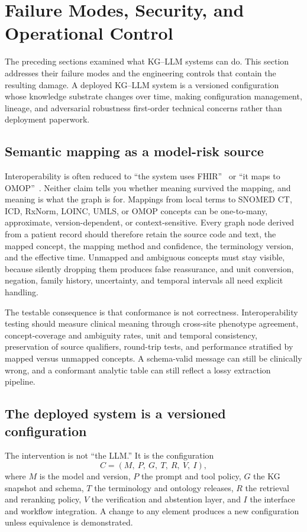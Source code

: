 \section{Failure Modes, Security, and Operational Control}
\label{sec:failure}

The preceding sections examined what KG--LLM systems can do. This section addresses their failure modes and the engineering controls that contain the resulting damage. A deployed KG--LLM system is a versioned configuration whose knowledge substrate changes over time, making configuration management, lineage, and adversarial robustness first-order technical concerns rather than deployment paperwork.

\subsection{Semantic mapping as a model-risk source}

Interoperability is often reduced to ``the system uses FHIR''~\cite{hl7fhir} or ``it maps to OMOP''~\cite{omop}. Neither claim tells you whether meaning survived the mapping, and meaning is what the graph is for. Mappings from local terms to SNOMED CT, ICD, RxNorm, LOINC, UMLS, or OMOP concepts can be one-to-many, approximate, version-dependent, or context-sensitive. Every graph node derived from a patient record should therefore retain the source code and text, the mapped concept, the mapping method and confidence, the terminology version, and the effective time. Unmapped and ambiguous concepts must stay visible, because silently dropping them produces false reassurance, and unit conversion, negation, family history, uncertainty, and temporal intervals all need explicit handling.

The testable consequence is that conformance is not correctness. Interoperability testing should measure clinical meaning through cross-site phenotype agreement, concept-coverage and ambiguity rates, unit and temporal consistency, preservation of source qualifiers, round-trip tests, and performance stratified by mapped versus unmapped concepts. A schema-valid message can still be clinically wrong, and a conformant analytic table can still reflect a lossy extraction pipeline.

\subsection{The deployed system is a versioned configuration}

The intervention is not ``the LLM.'' It is the configuration
\begin{equation}
C = (M,\ P,\ G,\ T,\ R,\ V,\ I),
\end{equation}
where $M$ is the model and version, $P$ the prompt and tool policy, $G$ the KG snapshot and schema, $T$ the terminology and ontology releases, $R$ the retrieval and reranking policy, $V$ the verification and abstention layer, and $I$ the interface and workflow integration. A change to any element produces a new configuration unless equivalence is demonstrated.


